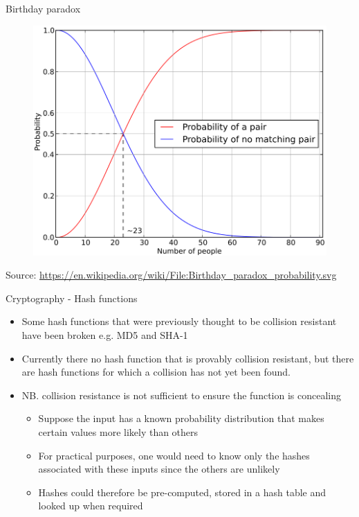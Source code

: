 \documentclass[10pt]{beamer}
\begin{document}

\begin{frame}{Birthday paradox}
	\begin{figure}[]
		\centering
		\includegraphics  [scale=0.2]{Images/paradox}
	\end{figure}
	\begin{tiny}
		Source: \href{https://en.wikipedia.org/wiki/File:Birthday_paradox_probability.svg}{https://en.wikipedia.org/wiki/File:Birthday\_paradox\_probability.svg}
	\end{tiny}
\end{frame}


\begin{frame}{Cryptography - Hash functions}
	\begin{itemize}
		\item Some hash functions that were previously thought to be collision resistant have been broken e.g. MD5 and SHA-1
		\item Currently there no hash function that is provably collision resistant, but there are hash functions for which a collision has not yet been found.
		\item NB. collision resistance is not sufficient to ensure the function is concealing
		\begin{itemize}
			\item Suppose the input has a known probability distribution that makes certain values more likely than others
			\item For practical purposes, one would need to know only the hashes associated with these inputs since the others are unlikely
			\item Hashes could therefore be pre-computed, stored in a hash table and looked up when required
		\end{itemize}
	\end{itemize}
\end{frame}
\end{document}

